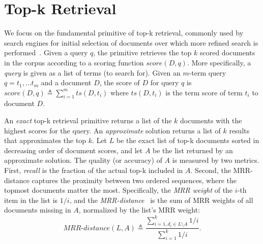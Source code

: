 

\section{Top-k Retrieval}
\label{sec:problem}

We focus on the fundamental primitive of top-k retrieval, commonly used by search engines for initial selection of documents over which more refined search is performed~\cite{Wang:2011}. 
Given a query $q$, the primitive retrieves the top $k$ scored documents in the corpus according to a scoring function $\textit{score}(D, q)$.  
%
More specifically, a \emph{query} is given as a list of terms (to search for). Given an $m$-term query $q = t_1, \dots t_m$ and a document $D$, the score of $D$ for query $q$ is 
$\textit{score}(D, q) \triangleq \sum_{i=1}^m ts(D, t_i)$ 
where $ts(D, t_i)$ is the term score of term $t_i$ to document $D$. 

An \emph{exact} top-k retrieval primitive returns a list of the $k$ documents with the highest scores for the query.
An \emph{approximate} solution returns a list of $k$ results that approximates the top $k$. 
Let $L$ be the exact list of top-k documents sorted in decreasing order of document scores,  
and let $A$ be the list returned by an approximate solution. 
The quality (or accuracy) of  $A$ is measured by two metrics. 
First, \emph{recall} is  the fraction of the actual top-k included in $A$.
Second, the
MRR-distance captures the proximity between two ordered sequences, where the topmost documents matter the most.  
Specifically, 
the \emph{MRR weight} of the $i$-th item in the list is $1/i$, and the \emph{MRR-distance}~\cite{Broder:2003}  is the sum of MRR weights of all documents missing in $A$, normalized by the list's MRR weight:
\begin{equation} \label{eq:mrr}
\textit{MRR-distance}(L,A) \triangleq \dfrac{\sum_{i=1,d_i \in L \setminus A}^k 1/i}{\sum_{i=1}^k 1/i}.
\nonumber
\end{equation}



